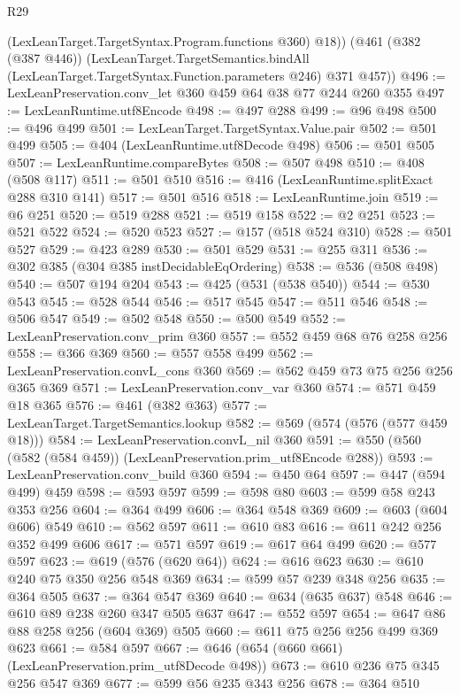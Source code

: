 \begin{lexlean}{R29}
\begin{coremodule}
        (LexLeanTarget.TargetSyntax.Program.functions @360)
        @18))
    (@461
      (@382 (@387 @446))
      (LexLeanTarget.TargetSemantics.bindAll
        (LexLeanTarget.TargetSyntax.Function.parameters @246)
        @371
        @457))
@496 := LexLeanPreservation.conv_let @360 @459 @64 @38 @77 @244 @260 @355
@497 := LexLeanRuntime.utf8Encode
@498 := @497 @288
@499 := @96 @498
@500 := @496 @499
@501 := LexLeanTarget.TargetSyntax.Value.pair
@502 := @501 @499
@505 := @404 (LexLeanRuntime.utf8Decode @498)
@506 := @501 @505
@507 := LexLeanRuntime.compareBytes
@508 := @507 @498
@510 := @408 (@508 @117)
@511 := @501 @510
@516 := @416 (LexLeanRuntime.splitExact @288 @310 @141)
@517 := @501 @516
@518 := LexLeanRuntime.join
@519 := @6 @251
@520 := @519 @288
@521 := @519 @158
@522 := @2 @251
@523 := @521 @522
@524 := @520 @523
@527 := @157 (@518 @524 @310)
@528 := @501 @527
@529 := @423 @289
@530 := @501 @529
@531 := @255 @311
@536 := @302 @385 (@304 @385 instDecidableEqOrdering)
@538 := @536 (@508 @498)
@540 := @507 @194 @204
@543 := @425 (@531 (@538 @540))
@544 := @530 @543
@545 := @528 @544
@546 := @517 @545
@547 := @511 @546
@548 := @506 @547
@549 := @502 @548
@550 := @500 @549
@552 := LexLeanPreservation.conv_prim @360
@557 := @552 @459 @68 @76 @258 @256
@558 := @366 @369
@560 := @557 @558 @499
@562 := LexLeanPreservation.convL_cons @360
@569 := @562 @459 @73 @75 @256 @256 @365 @369
@571 := LexLeanPreservation.conv_var @360
@574 := @571 @459 @18 @365
@576 := @461 (@382 @363)
@577 := LexLeanTarget.TargetSemantics.lookup
@582 := @569 (@574 (@576 (@577 @459 @18)))
@584 := LexLeanPreservation.convL_nil @360
@591 := @550 (@560 (@582 (@584 @459)) (LexLeanPreservation.prim_utf8Encode @288))
@593 := LexLeanPreservation.conv_build @360
@594 := @450 @64
@597 := @447 (@594 @499) @459
@598 := @593 @597
@599 := @598 @80
@603 := @599 @58 @243 @353 @256
@604 := @364 @499
@606 := @364 @548 @369
@609 := @603 (@604 @606) @549
@610 := @562 @597
@611 := @610 @83
@616 := @611 @242 @256 @352 @499 @606
@617 := @571 @597
@619 := @617 @64 @499
@620 := @577 @597
@623 := @619 (@576 (@620 @64))
@624 := @616 @623
@630 := @610 @240 @75 @350 @256 @548 @369
@634 := @599 @57 @239 @348 @256
@635 := @364 @505
@637 := @364 @547 @369
@640 := @634 (@635 @637) @548
@646 := @610 @89 @238 @260 @347 @505 @637
@647 := @552 @597
@654 := @647 @86 @88 @258 @256 (@604 @369) @505
@660 := @611 @75 @256 @256 @499 @369 @623
@661 := @584 @597
@667 := @646 (@654 (@660 @661) (LexLeanPreservation.prim_utf8Decode @498))
@673 := @610 @236 @75 @345 @256 @547 @369
@677 := @599 @56 @235 @343 @256
@678 := @364 @510

\end{coremodule}
\end{lexlean}
